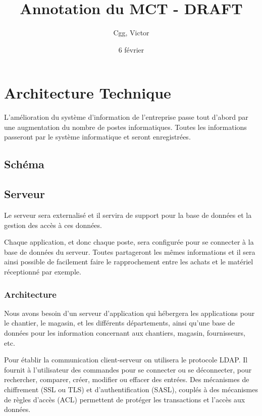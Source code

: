 \documentclass[a4paper]{article}
\title{Annotation du MCT - DRAFT}
\author{Cgg, Victor}
\date{6 février}
\begin{document}
\section{Architecture Technique}
L'amélioration du système d’information de l'entreprise passe tout d'abord
par une augmentation du nombre de postes informatiques. Toutes les
informations passeront par le système informatique et seront enregistrées.

\subsection{Schéma}



\subsection{Serveur}

Le serveur sera externalisé et il servira de support pour la base de
données et la gestion des accès à ces données. 

Chaque application, et donc chaque poste, sera configurée pour se connecter
à la base de données du serveur.  Toutes partageront les mêmes informations
et il sera ainsi possible de facilement faire le rapprochement entre les
achats et le matériel réceptionné par exemple.

	\subsubsection{Architecture}
Nous avons besoin d'un serveur d'application qui hébergera les applications
pour le chantier, le magasin, et les différents départements,  ainsi qu'une
base de données pour les information concernant aux chantiers, magasin,
fournisseurs, etc. 

Pour établir la communication client-serveur on utilisera le protocole
LDAP. Il fournit à l'utilisateur des commandes pour se connecter ou se
déconnecter,  pour rechercher, comparer, créer, modifier ou effacer des
entrées.  Des mécanismes de chiffrement (SSL ou TLS) et d'authentification
(SASL), couplés à des mécanismes de règles d'accès (ACL) permettent de
protéger les transactions et l'accès aux données.
\end{document}
